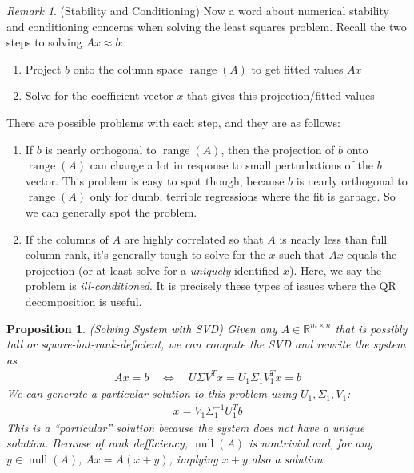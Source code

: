 \documentclass[12pt]{book}
\numberwithin{equation}{section} %
\theoremstyle{plain}
\newtheorem{prop}[thm]{Proposition}
\theoremstyle{definition}
\theoremstyle{remark}
\newtheorem*{rmk}{Remark}
\newcommand{\Rmn}{\mathbb{R}^{m\times n}}
\newcommand{\nul}{\operatorname{null}}
\newcommand{\range}{\operatorname{range}}
\begin{document}
\begin{rmk}({Stability and Conditioning})
Now a word about numerical stability and conditioning concerns when
solving the least squares problem. Recall the two steps to solving
$Ax\approx b$:
\begin{enumerate}[label=(\roman*)]
  \item Project $b$ onto the column space $\range(A)$ to get fitted
    values $Ax$
  \item Solve for the coefficient vector $x$ that gives this
    projection/fitted values
\end{enumerate}
There are possible problems with each step, and they are as follows:
\begin{enumerate}[label=(\roman*)]
  \item
    If $b$ is nearly orthogonal to $\range(A)$, then the projection of
    $b$ onto $\range(A)$ can change a lot in response to small
    perturbations of the $b$ vector. This problem is easy to spot
    though, because $b$ is nearly orthogonal to $\range(A)$ only for
    dumb, terrible regressions where the fit is garbage. So we can
    generally spot the problem.
  \item If the columns of $A$ are highly correlated so that $A$ is
    nearly less than full column rank, it's generally tough to solve for
    the $x$ such that $Ax$ equals the projection (or at least solve for
    a \emph{uniquely} identified $x$). Here, we say the problem is
    \emph{ill-conditioned}. It is precisely these types of issues where
    the QR decomposition is useful.
\end{enumerate}
\end{rmk}


\begin{prop}
\emph{(Solving System with SVD)}
Given any $A\in\Rmn$ that is possibly tall \emph{or}
square-but-rank-deficient, we can compute the SVD and rewrite the system
as
\begin{align*}
  Ax = b
  \quad\iff\quad
  U\Sigma V^Tx
  =
  U_1\Sigma_1 V_1^Tx
  = b
\end{align*}
We can generate a particular solution to this problem
using $U_1,\Sigma_1,V_1$:
\begin{align}
  x = V_1\Sigma_1^{-1}U_1^Tb
  \label{svdsoln}
\end{align}
This is a ``\emph{particular}'' solution because the system does not
have a unique solution.
Because of rank defficiency, $\nul(A)$ is nontrivial and, for any
$y\in\nul(A)$, $Ax=A(x+y)$, implying $x+y$ also a solution.
\end{prop}
\end{document}

